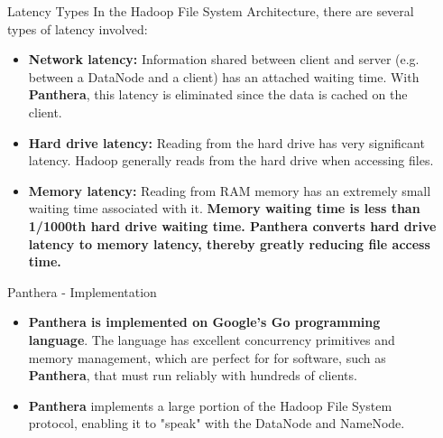\documentclass[final]{beamer} %
\begin{document}
\begin{frame}
\begin{columns}[t]
\begin{column}{0.32\textwidth}
	  
      \end{column}
      
      
      \begin{column}{0.32\textwidth}
            
	  \begin{block}{Latency Types}
		In the Hadoop File System Architecture, there are several types of latency involved:
		\begin{itemize}
		\item \textbf{Network latency: } Information shared between client and server (e.g. between a DataNode and a client) has an attached waiting time. With \textbf{Panthera}, this latency is eliminated since the data is cached on the client.
		\item \textbf{Hard drive latency: } Reading from the hard drive has very significant latency. Hadoop generally reads from the hard drive when accessing files.
		\item \textbf{Memory latency: } Reading from RAM memory has an extremely small
		waiting time associated with it. \textbf{Memory waiting time is less than 1/1000th hard drive waiting time. Panthera converts hard drive latency to memory latency, thereby greatly reducing file access time.}
		\end{itemize}
	  \end{block}
	\begin{block}{Panthera - Implementation}
	\begin{itemize}
		\item \textbf{Panthera is implemented on Google's Go programming language}. The language has excellent concurrency primitives and memory management, which are perfect for
		for software, such as \textbf{Panthera}, that must run reliably with hundreds of clients.
		\item \textbf{Panthera} implements a large portion of the Hadoop File System protocol, enabling it to "speak" with the DataNode and NameNode.
	\end{itemize}
	\end{block}
	

\end{column}
\end{columns}
\end{frame}
\end{document}

